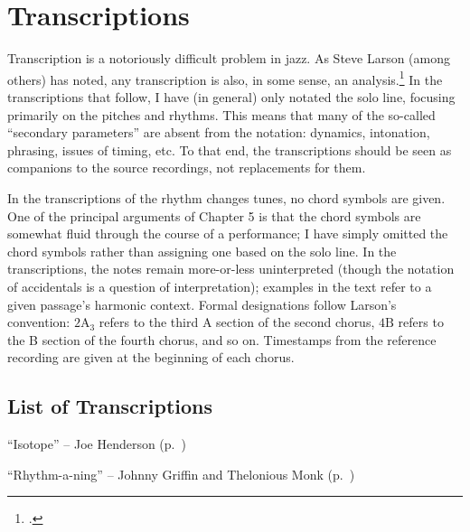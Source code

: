 \doublespacing
\chapter{Transcriptions}
\singlespacing

Transcription is a notoriously difficult problem in jazz. As Steve Larson
(among others) has noted, any transcription is also, in some sense, an
analysis.\footcite[2]{larson:2009} In the transcriptions that follow, I have
(in general) only notated the solo line, focusing primarily on the pitches and
rhythms. This means that many of the so-called ``secondary parameters'' are
absent from the notation: dynamics, intonation, phrasing, issues of timing,
etc. To that end, the transcriptions should be seen as companions to the
source recordings, not replacements for them.

In the transcriptions of the rhythm changes tunes, no chord symbols are given.
One of the principal arguments of Chapter 5 is that the chord symbols are
somewhat fluid through the course of a performance; I have simply omitted the
chord symbols rather than assigning one based on the solo line. In the
transcriptions, the notes remain more-or-less uninterpreted (though the
notation of accidentals is a question of interpretation); examples in the text
refer to a given passage's harmonic context. Formal designations follow
Larson's convention: $2\mathrm{A}_3$ refers to the third A section of the
second chorus, $4\mathrm{B}$ refers to the B section of the fourth chorus, and
so on. Timestamps from the reference recording are given at the beginning of
each chorus.

\section*{List of Transcriptions}

\begin{compactitem}
    \item ``Isotope'' -- Joe Henderson (p.~\pageref{transcription:isotope})
    \item ``Rhythm-a-ning'' -- Johnny Griffin and Thelonious Monk
      (p.~\pageref{transcription:rhythm-a-ning})
\end{compactitem}

\newpage

{}
\label{transcription:isotope}


{}
\label{transcription:rhythm-a-ning}


